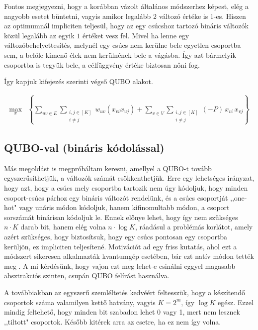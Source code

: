 Fontos megjegyezni, hogy a korábban vázolt általános módszerhez képest, elég a nagyobb esetet büntetni, vagyis amikor legalább 2 változó értéke is 1-es. Hiszen az optimumnál impliciten teljesül, hogy az egy csúcshoz tartozó bináris változók közül legalább az egyik $1$ értéket vesz fel. Mivel ha lenne egy változóbehelyettesítés, melynél egy csúcs nem kerülne bele egyetlen csoportba sem, a belőle kimenő élek nem kerülnének bele a vágásba. Így azt bármelyik csoportba is tegyük bele, a célfüggvény értéke biztosan nőni fog.

Így kapjuk  kifejezés szerinti végső QUBO alakot.

\begin{align} 
	\max_{x} & \left\{ \sum _{uv \in E}  \sum _{\substack{ i,j \in [K] \\  i \neq j}} w_{uv}(x_{vi}  x_{uj}) + \sum _{v \in V } \sum _{\substack{ i,j \in [K] \\  i \neq j}} (-P) \, x_{vi} \, x_{vj}\right\} 
	\label{QUBOOnehot}
\end{align}


\subsection{QUBO-val (bináris kódolással)}\label{sec:QUBObinary}

Más megoldást is megpróbáltam keresni, amellyel a QUBO-t tovább egyszerűsíthetjük, a változók számát csökkenthetjük. Erre egy lehetséges irányzat, hogy azt, hogy a csúcs mely csoportba tartozik nem úgy kódoljuk, hogy minden csoport-csúcs párhoz egy bináris változót rendelünk, és a csúcs csoportját ,,one-hot" vagy unáris módon kódoljuk, hanem kifinomultabb módon, a csoport sorszámát binárisan kódoljuk le. Ennek előnye lehet, hogy így nem szükséges $n \cdot K$ darab bit, hanem elég volna $n \cdot \log K$, ráadásul a problémás korlátot, amely azért szükséges, hogy biztosítsuk, hogy egy csúcs pontosan egy csoportba kerüljön, ez impliciten teljesítené. Motivációt ad egy friss kutatás, ahol ezt a módszert sikeresen alkalmazták kvantumgép esetében, bár ezt natív módon tették meg  \cite{fuchs2020efficient}. A mi kérdésünk, hogy vajon ezt meg lehet-e csinálni eggyel magasabb absztrakciós szinten, csupán QUBO felírást használva.

A továbbiakban az egyszerű szemléltetés kedvéért feltesszük, hogy a készítendő csoportok száma valamilyen kettő hatvány, vagyis $K=2^m$, így $\log K$ egész. Ezzel mindig feltehető, hogy minden bit szabadon lehet 0 vagy 1, mert nem lesznek ,,tiltott" csoportok. Később kitérek arra az esetre, ha ez nem így volna.

